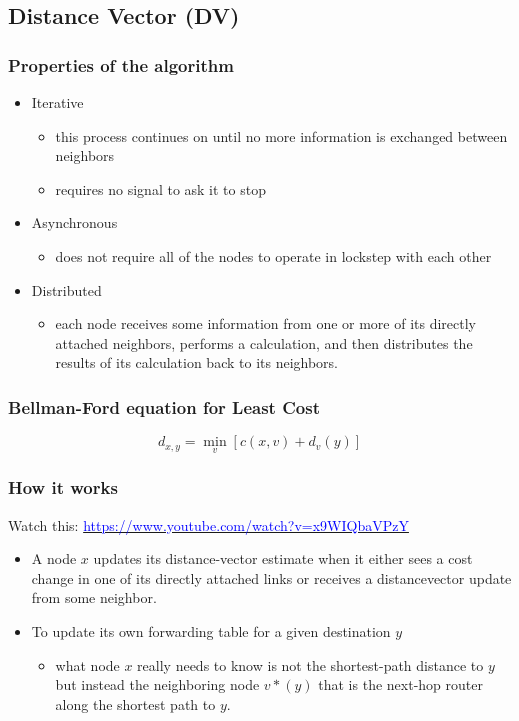 \documentclass[a4paper]{article}
\begin{document}
\subsection{Distance Vector (DV)}
\subsubsection{Properties of the algorithm}
\begin{itemize}
    \item Iterative
    \begin{itemize}[label=$\circ$]
        \item this process continues on until no more information is exchanged between neighbors
        \item requires no signal to ask it to stop
    \end{itemize}
    \item Asynchronous
    \begin{itemize}[label=$\circ$]
        \item does not require all of the nodes to operate in lockstep with each other
    \end{itemize}
    \item Distributed
    \begin{itemize}[label=$\circ$]
        \item each node receives some information from one or more of its directly attached neighbors, performs a calculation, and then distributes the results of its calculation back to its neighbors.
    \end{itemize}
\end{itemize}

\subsubsection{Bellman-Ford equation for Least Cost}
$$ d_{x,y} = \min_v\left[c(x,v) + d_v(y)\right]$$

\newpage
\subsubsection{How it works}
Watch this: \href{https://www.youtube.com/watch?v=x9WIQbaVPzY}{\textcolor{blue}{https://www.youtube.com/watch?v=x9WIQbaVPzY}}
\begin{itemize}
    \item A node $x$ updates its distance-vector estimate when it either sees a cost change in one of its directly attached links or receives a distancevector update from some neighbor.
    \item To update its own forwarding table for a given destination $y$
    \begin{itemize}[label=$\circ$]
        \item what node $x$ really needs to know is not the shortest-path distance to $y$ but instead the neighboring node $v*(y)$ that is the next-hop router along the shortest path to $y$.
    \end{itemize}
\end{itemize}
\end{document}
